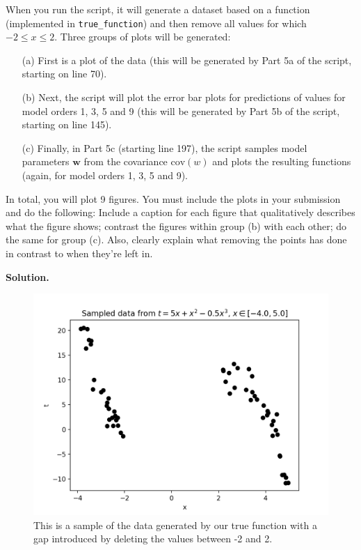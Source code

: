 \documentclass[10pt]{article}
\begin{document}
\begin{itemize}
When you run the script, it will generate a dataset based on a function (implemented in {\tt true\_function}) and then remove all values for which $-2 \leq x \leq 2$.  Three groups of plots will be generated:
\begin{enumerate}
\item[(a)] First is a plot of the data (this will be generated by Part 5a of the script, starting on line 70).  
\item[(b)] Next, the script will plot the error bar plots for predictions of values for model orders 1, 3, 5 and 9 (this will be generated by Part 5b of the script, starting on line 145).  
\item[(c)] Finally, in Part 5c (starting line 197), the script samples model parameters $\mathbf{w}$ from the covariance $\mathrm{cov}(w)$ and plots the resulting functions (again, for model orders 1, 3, 5 and 9).
\end{enumerate}

In total, you will plot 9 figures.  You must include the plots in your submission and do the following: Include a caption for each figure that qualitatively describes what the figure shows; contrast the figures within group (b) with each other; do the same for group (c).  Also, clearly explain what removing the points has done in contrast to when they're left in.

{\bf Solution.}

\begin{figure}[H]
\centering
  \includegraphics[width=\linewidth]{data.png}
 \caption{This is a sample of the data generated by our true 
 function with a gap introduced by deleting the values between -2 and 2.}
\label{label}
\end{figure}


\end{itemize}
\end{document}
